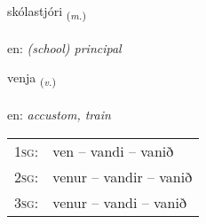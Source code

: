 \documentclass[frontgrid, backgrid]{flacards}\usepackage[]{graphicx}\usepackage[]{xcolor}
\begin{document}
\renewcommand{\blhead}{\vskip5pt {\small\bfseries\footnotesize Nafnorð | Noun }}
\renewcommand{\bcfoot}{\vskip5pt \hspace{2pt}{\small\bfseries\footnotesize 3K}}


{skólastjóri \small{\textsubscript{(\textit{m.})}} \\[1ex] %
\textphonetic{[skouːlastjourɪ]} \\
en: \emph{(school) principal} \\  [2ex]
\renewcommand*{\arraystretch}{0.8}
}

\renewcommand{\flhead}{\vskip5pt \fboxsep=0pt {\small\bfseries\footnotesize Sagnorð | Verb}}
\renewcommand{\fcfoot}{\vskip5pt \fboxsep=0pt \hspace{2pt}{\small\bfseries\footnotesize 3K}}

\renewcommand{\blhead}{\vskip5pt {\small\bfseries\footnotesize Sagnorð | Verb }}
\renewcommand{\bcfoot}{\vskip5pt \hspace{2pt}{\small\bfseries\footnotesize 3K}}


{venja \small{\textsubscript{(\textit{v.})}} \\[1ex] %
\textphonetic{[vɛnja]} \\
en: \emph{accustom, train} \\  [2ex]
\renewcommand*{\arraystretch}{0.8}
\begin{tabular}{p{1cm}l}
\textsc{1sg}: & ven -- vandi -- vanið \\ 
\textsc{2sg}: & venur -- vandir -- vanið \\ 
\textsc{3sg}: & venur -- vandi -- vanið \\ 
\end{tabular}
}

\renewcommand{\flhead}{\vskip5pt \fboxsep=0pt {\small\bfseries\footnotesize Lýsingarorð | Adjective}}
\renewcommand{\fcfoot}{\vskip5pt \fboxsep=0pt \hspace{2pt}{\small\bfseries\footnotesize 3K}}
\end{document}
